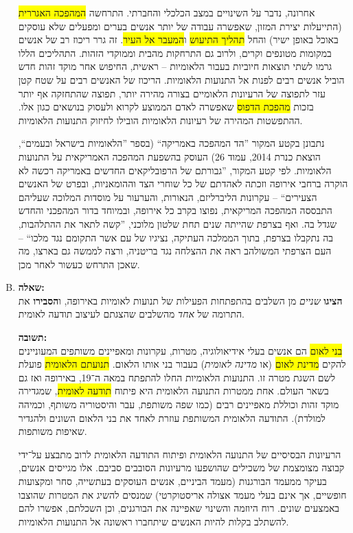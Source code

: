 \documentclass[a4paper]{article}
\newcommand\hl[1]   {\colorbox{yellow}{\!\!#1\!\!}}
\begin{document}
\begin{enumerate}[A.]
			אחרונה, נדבר על השינויים במצב הכלכלי והחברתי. התרחשה \hl{המהפכה האגררית} (התייעלות יצירת המזון, שאפשרה עבודה של יותר אנשים בערים ומפעלים שלא עוסקים באוכל באופן ישיר) והחל \hl{תהליך התיעוש} ו\hl{המעבר אל העיר}. זה גרר ריכוז רב של אנשים במקומות מטונפים וקרים, ולרוב גם התרחקות מהבית וממוקדי הזהות. התהליכים הללו גרמו לשתי תוצאות חיוביות בעבור הלאומיות – ראשית, החיפוש אחר מוקד זהות חדש הוביל אנשים רבים לפנות אל התנועות הלאומיות. הריכוז של האנשים רבים על שטח קטן עזר לתפוצה של הרעיונות הלאומיים בצורה מהירה יותר, תפוצה שהתחזקה אף יותר בזכות \hl{מהפכת הדפוס} שאפשרה לאדם הממוצע לקרוא ולעסוק בנושאים כגון אלו. ההתפשטות המהירה של רעיונות הלאומיות הובילו לחיזוק התנועות הלאומיות. 
			
			נתבונן בקטע המקור ''הד המהפכה באמריקה`` (בספר ''הלאומיות בישראל ובעמים``, הוצאת כנרת 2014, עמוד 26) העוסק בהשפעת המהפכה האמריקאית על התנועות הלאומיות. לפי קטע המקור, ''גבורתם של הרפובליקאים החדשים באמריקה רכשה לא הוקרה ברחבי אירופה וזכתה לאהדתם של כל שוחרי הצד וההומאניות, ובפרט של האנשים הצעירים`` – עקרונות הליברליזם, הנאורות, והערעור על מוסדות המלוכה שעליהם התבססה המהפכה המריקאית, נפוצו בקרב כל אירופה, ובמיוחד בדור המהפכני והחדש שגדל בה. ואף בצרפת שהייתה שנים תחת שלטון מלוכני, ''קשה לתאר את ההתלהבות, בה נתקבלו בצרפת, בתוך הממלכה העתיקה, נציגיו של עם אשר התקומם נגד מלכו`` – העם הצרפתי המשולהב ראה את ההצלחה נגד בריטניה, ורצה לממשה גם בארצו, מה שאכן התרחש כעשור לאחר מכן. 
			
			\item \textbf{שאלה: }\\
			\textbf{הציגו} \textit{שניים} מן השלבים בהתפתחות הפעילות של תנועות לאומיות באירופה, ו\textbf{הסבירו} את התרומה של \textit{אחד} מהשלבים שהצגתם לעיצוב תודעה לאומית. 
			
			\textbf{תשובה: } \\
			\hl{בני לאום} הם אנשים בעלי אידיאולוגיה, מטרות, עקרונות ומאפיינים משותפים המעוניינים להקים \hl{מדינת לאום} (או \textit{מדינה לאומית}) בעבור בני אותו הלאום. \hl{תנועתם הלאומית} פועלת לשם השגת מטרה זו. התנועות הלאומיות החלו להתפתח במאה ה־19, באירופה ואז גם בשאר העולם. אחת ממטרות התנועה הלאומית היא פיתוח \hl{תודעה לאומית}, שמגדירה מוקד זהות וכוללת מאפיינים רבים (כמו שפה משותפת, עבר והיסטוריה משותף, וכמיהה למולדת). התודעה הלאומית המשותפת עוזרת לאחד את בני הלאום השונים ולהגדיר שאיפות משותפות. 
			
			הרעיונות הבסיסיים של התנועה הלאומית ופיתוח התודעה הלאומית לרוב מתבצע על־ידי קבוצה מצומצמת של משכילים שהושפעו מרעיונות הסובבים סביבם. אלו מגייסים אנשים, בעיקר ממעמד הבורגנות (מעמד הביניים, אנשים העוסקים בעתשייה, סחר ומקצועות חופשיים, אך אינם בעלי מעמד אצולה אריסטוקרטי) שמנסים להשיג את המטרות שהוצבו באמצעים שונים. רוח היוזמה והשינוי שאפיינה את הבורגנים, וכן השכלתם, אפשרו להם להשתלב בקלות להיות האנשים שיתחברו ראשונה אל התנועות הלאומיות. 
			

\end{enumerate}
\end{document}
